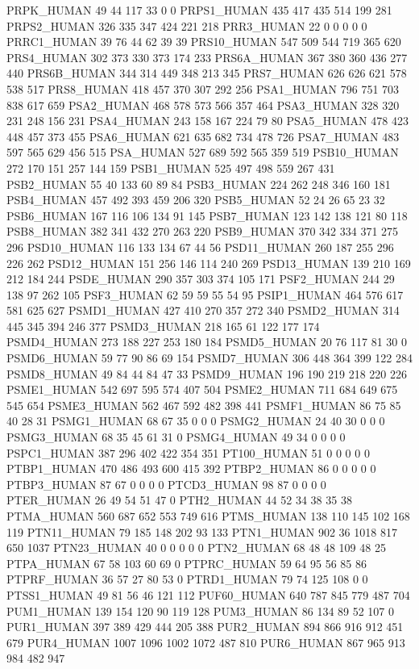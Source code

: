 PRPK_HUMAN	49	44	117	33	0	0
PRPS1_HUMAN	435	417	435	514	199	281
PRPS2_HUMAN	326	335	347	424	221	218
PRR3_HUMAN	22	0	0	0	0	0
PRRC1_HUMAN	39	76	44	62	39	39
PRS10_HUMAN	547	509	544	719	365	620
PRS4_HUMAN	302	373	330	373	174	233
PRS6A_HUMAN	367	380	360	436	277	440
PRS6B_HUMAN	344	314	449	348	213	345
PRS7_HUMAN	626	626	621	578	538	517
PRS8_HUMAN	418	457	370	307	292	256
PSA1_HUMAN	796	751	703	838	617	659
PSA2_HUMAN	468	578	573	566	357	464
PSA3_HUMAN	328	320	231	248	156	231
PSA4_HUMAN	243	158	167	224	79	80
PSA5_HUMAN	478	423	448	457	373	455
PSA6_HUMAN	621	635	682	734	478	726
PSA7_HUMAN	483	597	565	629	456	515
PSA_HUMAN	527	689	592	565	359	519
PSB10_HUMAN	272	170	151	257	144	159
PSB1_HUMAN	525	497	498	559	267	431
PSB2_HUMAN	55	40	133	60	89	84
PSB3_HUMAN	224	262	248	346	160	181
PSB4_HUMAN	457	492	393	459	206	320
PSB5_HUMAN	52	24	26	65	23	32
PSB6_HUMAN	167	116	106	134	91	145
PSB7_HUMAN	123	142	138	121	80	118
PSB8_HUMAN	382	341	432	270	263	220
PSB9_HUMAN	370	342	334	371	275	296
PSD10_HUMAN	116	133	134	67	44	56
PSD11_HUMAN	260	187	255	296	226	262
PSD12_HUMAN	151	256	146	114	240	269
PSD13_HUMAN	139	210	169	212	184	244
PSDE_HUMAN	290	357	303	374	105	171
PSF2_HUMAN	244	29	138	97	262	105
PSF3_HUMAN	62	59	59	55	54	95
PSIP1_HUMAN	464	576	617	581	625	627
PSMD1_HUMAN	427	410	270	357	272	340
PSMD2_HUMAN	314	445	345	394	246	377
PSMD3_HUMAN	218	165	61	122	177	174
PSMD4_HUMAN	273	188	227	253	180	184
PSMD5_HUMAN	20	76	117	81	30	0
PSMD6_HUMAN	59	77	90	86	69	154
PSMD7_HUMAN	306	448	364	399	122	284
PSMD8_HUMAN	49	84	44	84	47	33
PSMD9_HUMAN	196	190	219	218	220	226
PSME1_HUMAN	542	697	595	574	407	504
PSME2_HUMAN	711	684	649	675	545	654
PSME3_HUMAN	562	467	592	482	398	441
PSMF1_HUMAN	86	75	85	40	28	31
PSMG1_HUMAN	68	67	35	0	0	0
PSMG2_HUMAN	24	40	30	0	0	0
PSMG3_HUMAN	68	35	45	61	31	0
PSMG4_HUMAN	49	34	0	0	0	0
PSPC1_HUMAN	387	296	402	422	354	351
PT100_HUMAN	51	0	0	0	0	0
PTBP1_HUMAN	470	486	493	600	415	392
PTBP2_HUMAN	86	0	0	0	0	0
PTBP3_HUMAN	87	67	0	0	0	0
PTCD3_HUMAN	98	87	0	0	0	0
PTER_HUMAN	26	49	54	51	47	0
PTH2_HUMAN	44	52	34	38	35	38
PTMA_HUMAN	560	687	652	553	749	616
PTMS_HUMAN	138	110	145	102	168	119
PTN11_HUMAN	79	185	148	202	93	133
PTN1_HUMAN	902	36	1018	817	650	1037
PTN23_HUMAN	40	0	0	0	0	0
PTN2_HUMAN	68	48	48	109	48	25
PTPA_HUMAN	67	58	103	60	69	0
PTPRC_HUMAN	59	64	95	56	85	86
PTPRF_HUMAN	36	57	27	80	53	0
PTRD1_HUMAN	79	74	125	108	0	0
PTSS1_HUMAN	49	81	56	46	121	112
PUF60_HUMAN	640	787	845	779	487	704
PUM1_HUMAN	139	154	120	90	119	128
PUM3_HUMAN	86	134	89	52	107	0
PUR1_HUMAN	397	389	429	444	205	388
PUR2_HUMAN	894	866	916	912	451	679
PUR4_HUMAN	1007	1096	1002	1072	487	810
PUR6_HUMAN	867	965	913	984	482	947
